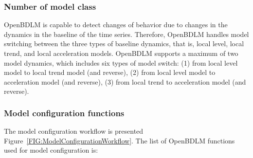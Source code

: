 \subsubsection{Number of model class}

OpenBDLM is capable to detect changes of behavior due to changes in the dynamics in the baseline of the time series. 
Therefore, OpenBDLM handles model switching between the three types of baseline dynamics, that is, local level, local trend, and local acceleration models. 
OpenBDLM supports a maximum of two model dynamics, which includes six types of model switch: (1) from local level model to local trend model (and reverse), (2) from local level model to acceleration model (and reverse), (3) from local trend to acceleration model (and reverse).


\subsubsection{Model configuration functions}

The model configuration workflow is presented Figure~\ref{FIG:ModelConfigurationWorkflow}. The list of OpenBDLM functions used for model configuration is:

